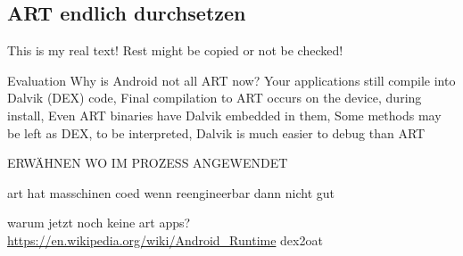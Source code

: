 \subsection{ART endlich durchsetzen} \label{subsection:counter-external-art}
This is my real text! Rest might be copied or not be checked!


%
Evaluation
Why is Android not all ART now? Your applications still compile into Dalvik (DEX) code, Final compilation to ART occurs on the device, during install, Even ART binaries have Dalvik embedded in them, Some methods may be left as DEX, to be interpreted, Dalvik is much easier to debug than ART\newline
\cite{andevconDalvikART}
%

ERWÄHNEN WO IM PROZESS ANGEWENDET\newline

art hat masschinen coed\newline
wenn reengineerbar dann nicht gut

warum jetzt noch keine art apps?
\url{https://en.wikipedia.org/wiki/Android_Runtime}\newline
dex2oat\newline
